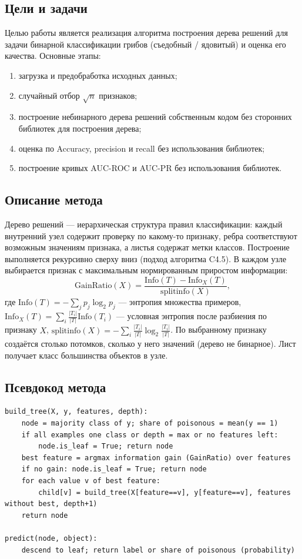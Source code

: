 \documentclass[12pt,a4paper]{article}
\begin{document}
\subsection{Цели и задачи}
Целью работы является реализация алгоритма построения дерева решений для задачи бинарной классификации грибов (съедобный / ядовитый) и оценка его качества. Основные этапы:
\begin{enumerate}
\item загрузка и предобработка исходных данных;
\item случайный отбор $\sqrt{n}$ признаков;
\item построение небинарного дерева решений собственным кодом без сторонних библиотек для построения дерева;
\item оценка по Accuracy, precision и recall без использования библиотек;
\item построение кривых AUC-ROC и AUC-PR без использования библиотек.
\end{enumerate}

\subsection{Описание метода}
Дерево решений --- иерархическая структура правил классификации: каждый внутренний узел содержит проверку по какому-то признаку, ребра соответствуют возможным значениям признака, а листья содержат метки классов. Построение выполняется рекурсивно сверху вниз (подход алгоритма C4.5). В каждом узле выбирается признак с максимальным нормированным приростом информации:
\begin{equation}
\mathrm{GainRatio}(X) = \frac{\mathrm{Info}(T) - \mathrm{Info}_X(T)}{\mathrm{splitinfo}(X)},
\end{equation}
где $\mathrm{Info}(T) = -\sum_j p_j \log_2 p_j$ --- энтропия множества примеров, $\mathrm{Info}_X(T) = \sum_i \frac{|T_i|}{|T|}\mathrm{Info}(T_i)$ --- условная энтропия после разбиения по признаку $X$, $\mathrm{splitinfo}(X) = -\sum_i \frac{|T_i|}{|T|}\log_2\frac{|T_i|}{|T|}$. По выбранному признаку создаётся столько потомков, сколько у него значений (дерево не бинарное). Лист получает класс большинства объектов в узле.

\subsection{Псевдокод метода}
\begin{lstlisting}
build_tree(X, y, features, depth):
    node = majority class of y; share of poisonous = mean(y == 1)
    if all examples one class or depth = max or no features left:
        node.is_leaf = True; return node
    best feature = argmax information gain (GainRatio) over features
    if no gain: node.is_leaf = True; return node
    for each value v of best feature:
        child[v] = build_tree(X[feature==v], y[feature==v], features without best, depth+1)
    return node

predict(node, object):
    descend to leaf; return label or share of poisonous (probability)
\end{lstlisting}
\end{document}
